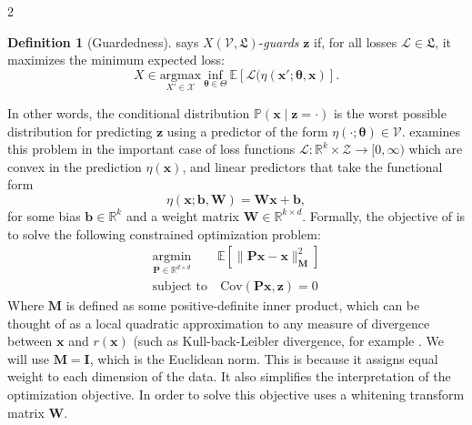 \documentclass[ecta,nameyear,final]{econsocart}
\numberwithin{equation}{section}
\theoremstyle{plain}
\theoremstyle{definition}
\newtheorem{definition}{Definition}
\begin{document}
\begin{multicols}{2}
\begin{definition}[Guardedness]
    \newline \newline
    \cite{Belrose2023} says $X(\mathcal{V},\mathfrak{L})$-\emph{guards} $\mathbf{z}$ if, for all losses $\mathcal{L} \in \mathfrak{L}$, it maximizes the minimum expected loss:
    $$
    X \in \underset{X'\in \mathcal{X}}{\text{argmax}}\  \underset{\boldsymbol{\theta}\in \Theta}{\text{inf}} \ \mathbb{E}[\mathcal{L}(\eta(\mathbf{x}';\boldsymbol{\theta},\mathbf{x})].
    $$
\end{definition}
In other words, the conditional distribution $\mathbb{P}(\mathbf{x}\mid \mathbf{z} = \cdot)$ is the worst possible distribution for predicting $\mathbf{z}$ using a predictor of the form $\eta(\cdot;\boldsymbol{\theta}) \in \mathcal{V}$.
\cite{Belrose2023} examines this problem in the important case of loss functions $\mathcal{L} : \mathbb{R}^k \times \mathcal{Z} \to [0,\infty)$ which are convex in the prediction $\eta(\mathbf{x})$, and linear predictors that take the functional form
\begin{equation}
    \eta(\mathbf{x};\mathbf{b},\mathbf{W}) = \mathbf{Wx} + \mathbf{b},
\end{equation}
for some bias $\mathbf{b} \in \mathbb{R}^k$ and a weight matrix $\mathbf{W} \in \mathbb{R}^{k \times d}$.
\newline \newline
Formally, the objective of \cite{Belrose2023} is to solve the following constrained optimization problem:
\begin{align}
    \underset{\mathbf{P} \in \mathbb{R}^{d \times d}}{\text{argmin}} \ & \mathbb{E}[\| \mathbf{P}\mathbf{x} - \mathbf{x}\|^2_{\mathbf{M}}]\\ \text{subject to}& \ \text{Cov}(\mathbf{P}\mathbf{x},\mathbf{z}) = 0
\end{align}
Where $\mathbf{M}$ is defined as some positive-definite inner product, which can be thought of as a local quadratic approximation to any measure of divergence between $\mathbf{x}$ and $r(\mathbf{x})$ (such as Kull-back-Leibler divergence, for example \citep{Belrose2023}.
\newline \newline
We will use $\mathbf{M} = \mathbf{I}$, which is the Euclidean norm. This is because it assigns equal weight to each dimension of the data. It also simplifies the interpretation of the optimization objective.
\newline \newline
In order to solve this objective \cite{Belrose2023} uses a whitening transform matrix $\mathbf{W}$.

\end{multicols}
\end{document}
